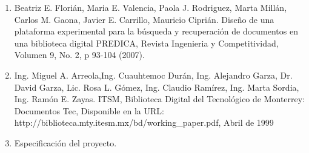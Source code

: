 %
%

\begin{enumerate}
	\item Beatriz E. Florián, Maria E.
    Valencia, Paola J. Rodriguez, Marta Millán, Carlos M. Gaona, Javier E. Carrillo,
    Mauricio Ciprián. Diseño de una plataforma experimental para la búsqueda y
    recuperación de documentos en una biblioteca digital PREDICA,  Revista Ingenieria y
    Competitividad, Volumen 9, No. 2, p 93-104 (2007).
                
    \item Ing. Miguel A. Arreola,Ing. Cuauhtemoc Durán, Ing. Alejandro Garza,
    Dr. David Garza, Lic. Rosa L. Gómez, Ing. Claudio Ramírez, Ing. Marta Sordia,
    Ing. Ramón E. Zayas. ITSM, Biblioteca Digital del Tecnológico de Monterrey: Documentos
    Tec, Disponible en la URL: http://biblioteca.mty.itesm.mx/bd/working\_paper.pdf,
    Abril de 1999                
                
    \item Especificación del proyecto.
\end{enumerate}            

%